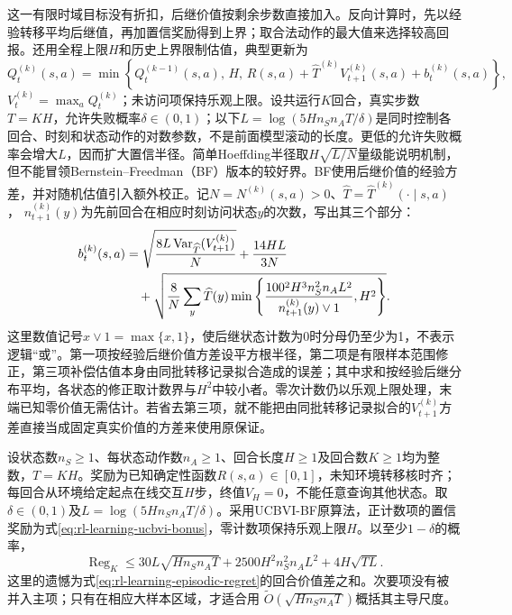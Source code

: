 这一有限时域目标没有折扣，后继价值按剩余步数直接加入。反向计算时，先以经验转移平均后继值，再加置信奖励得到上界；取合法动作的最大值来选择较高回报。还用全程上限$H$和历史上界限制估值，典型更新为
\[
 Q_t^{(k)}(s,a)
   =\min\left\{Q_t^{(k-1)}(s,a),\,H,\,
       R(s,a)+\widehat T^{(k)}V_{t+1}^{(k)}(s,a)
                         +b_t^{(k)}(s,a)\right\},
\]
$V_t^{(k)}=\max_aQ_t^{(k)}$；未访问项保持乐观上限。设共运行$K$回合，真实步数$T=KH$，允许失败概率$\delta\in(0,1)$；以下$L=\log(5Hn_Sn_AT/\delta)$是同时控制各回合、时刻和状态动作的对数参数，不是前面模型滚动的长度。更低的允许失败概率会增大$L$，因而扩大置信半径。简单Hoeffding半径取$H\sqrt{L/N}$量级能说明机制，但不能冒领Bernstein--Freedman（BF）版本的较好界。BF使用后继价值的经验方差，并对随机估值引入额外校正。记$N=N^{(k)}(s,a)>0$、$\widehat T=\widehat T^{(k)}(\cdot\mid s,a)$，
$n_{t+1}^{(k)}(y)$为先前回合在相应时刻访问状态$y$的次数，写出其三个部分：
\begin{align}
 b_t^{(k)}(s,a)
  &=\sqrt{\frac{8L\operatorname{Var}_{\widehat T}
                                  (V_{t+1}^{(k)})}{N}}
       +\frac{14HL}{3N}\notag\\
  &\quad+\sqrt{\frac{8}{N}\sum_y\widehat T(y)
         \min\left\{
           \frac{100^2H^3n_S^2n_AL^2}{n_{t+1}^{(k)}(y)\vee1},H^2
                  \right\}} .
 \label{eq:rl-learning-ucbvi-bonus}
\end{align}
这里数值记号$x\vee1=\max\{x,1\}$，使后继状态计数为0时分母仍至少为1，不表示逻辑“或”。第一项按经验后继价值方差设平方根半径，第二项是有限样本范围修正，第三项补偿估值本身由同批转移记录拟合造成的误差；其中求和按经验后继分布平均，各状态的修正取计数界与$H^2$中较小者。零次计数仍以乐观上限处理，末端已知零价值无需估计。若省去第三项，就不能把由同批转移记录拟合的$V_{t+1}^{(k)}$方差直接当成固定真实价值的方差来使用原保证。

\begin{theorem}
  \label{thm:rl-learning-ucbvi}
  设状态数$n_S\geq1$、每状态动作数$n_A\geq1$、回合长度$H\geq1$及回合数$K\geq1$均为整数，$T=KH$。奖励为已知确定性函数$R(s,a)\in[0,1]$，未知环境转移核时齐；每回合从环境给定起点在线交互$H$步，终值$V_H=0$，不能任意查询其他状态。取$\delta\in(0,1)$及$L=\log(5Hn_Sn_AT/\delta)$。采用UCBVI-BF原算法，正计数项的置信奖励为式\eqref{eq:rl-learning-ucbvi-bonus}，零计数项保持乐观上限$H$。以至少$1-\delta$的概率，
  \begin{equation}
    \operatorname{Reg}_K
      \leq30L\sqrt{Hn_Sn_AT}
          +2500H^2n_S^2n_AL^2
          +4H\sqrt{TL}.
    \label{eq:rl-learning-ucbvi-bound}
  \end{equation}
  这里的遗憾为式\eqref{eq:rl-learning-episodic-regret}的回合价值差之和。次要项没有被并入主项；只有在相应大样本区域，才适合用
  $\widetilde O(\sqrt{Hn_Sn_AT})$概括其主导尺度。
\end{theorem}

